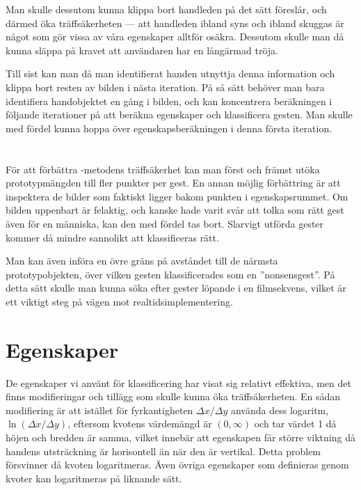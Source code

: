 \documentclass[../rapport_MVEX01-11-05]{subfiles}
\begin{document}
Man skulle dessutom kunna klippa bort handleden på det sätt
 föreslår, och därmed öka träffsäkerheten --- att
handleden ibland syns och ibland skuggas är något som gör vissa av våra
egenskaper alltför osäkra. Dessutom skulle man då kunna släppa på kravet
att användaren har en långärmad tröja.

Till sist kan man då man identifierat handen utnyttja denna information och
klippa bort resten av bilden i nästa iteration. På så sätt behöver man bara
identifiera handobjektet en gång i bilden, och kan koncentrera beräkningen
i följande iterationer på att beräkna egenskaper och klassificera gesten.
Man skulle med fördel kunna hoppa över egenskapsberäkningen i denna första
iteration.

\section{\knn}
För att förbättra \knn-metodens träffsäkerhet kan man först och
främst utöka prototypmängden till fler punkter per gest. En annan möjlig
förbättring är att inspektera de bilder som faktiskt ligger bakom
punkten i egenskapsrummet. Om bilden uppenbart är felaktig, och kanske hade varit
svår att tolka som rätt gest även för en människa, kan den med fördel tas bort.
Slarvigt utförda gester kommer då mindre sannolikt att
klassificeras rätt.

Man kan även införa en övre gräns på avståndet till de närmsta
prototypobjekten, över vilken gesten klassificerades som en
''nonsensgest''. På detta sätt skulle man kunna söka efter gester
löpande i en filmsekvens, vilket är ett viktigt steg på vägen mot
realtidsimplementering.

\section{Egenskaper}
De egenskaper vi använt för klassificering har visat sig relativt
effektiva, men det finns modifieringar och tillägg som skulle kunna
öka träffsäkerheten.
En sådan modifiering är att istället för fyrkantigheten $\Delta
x/\Delta y$ använda dess logaritm, $\ln(\Delta x/\Delta
y)$, eftersom kvotens värdemängd är $(0,\infty)$ och tar värdet 1 då
höjen och bredden är samma, vilket innebär att egenskapen får större
viktning då handens utsträckning är horisontell än när den är vertikal. Detta problem
försvinner då kvoten logaritmeras. Även övriga egenskaper som
definieras genom kvoter kan logaritmeras på liknande sätt.
\end{document}
